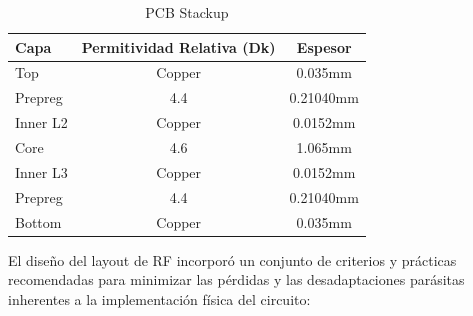 \begin{table}[b]
    \caption{PCB Stackup}
    \label{tab:pcb_stackup}
    \centering
    \renewcommand{\arraystretch}{1.1}
    \begin{tabular}{|l|c|c|}
        \hline
        \textbf{Capa} & \textbf{Permitividad Relativa (Dk)} & \textbf{Espesor} \\
        \hline
        Top      & \cellcolor{coppercolor}Copper  & 0.035mm   \\ \hline
        Prepreg  & \cellcolor{dielectriccolor}4.4 & 0.21040mm \\ \hline
        Inner L2 & \cellcolor{coppercolor}Copper  & 0.0152mm  \\ \hline
        Core     & \cellcolor{dielectriccolor}4.6 & 1.065mm   \\ \hline
        Inner L3 & \cellcolor{coppercolor}Copper  & 0.0152mm  \\ \hline
        Prepreg  & \cellcolor{dielectriccolor}4.4 & 0.21040mm \\ \hline
        Bottom   & \cellcolor{coppercolor}Copper  & 0.035mm   \\
        \hline
    \end{tabular}
\end{table}

El diseño del layout de RF incorporó un conjunto de criterios y prácticas recomendadas para minimizar las pérdidas y las desadaptaciones parásitas inherentes a la implementación física del circuito:

